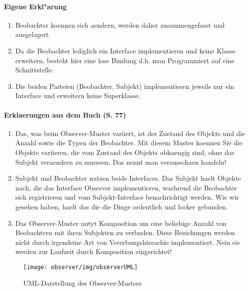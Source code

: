 \paragraph{Eigene Erkl"arung}
\begin{enumerate}
\item Beobachter koennen sich aendern, werden daher zusammengefasst und ausgelagert.
\item Da die Beobachter lediglich ein Interface implementieren und keine Klasse erweitern, besteht 
   hier eine lose Bindung d.h. man Programmiert auf eine Schnittstelle.
\item Die beiden Parteien (Beobachter, Subjekt) implementieren jeweils nur ein Interface und 
   erweitern keine Superklasse.
\end{enumerate}
   
\paragraph{Erklaerungen aus dem Buch (S. 77)}
\begin{enumerate}
\item Das, was beim Observer-Muster variiert, ist der Zustand des Objekts und die Anzahl sowie die 
   Typen der Beobachter. Mit diesem Muster koennen Sie die Objekte variieren, die vom Zustand des 
   Objekts abhaengig sind, ohne das Subjekt veraendern zu muessen. Das nennt man verausschaen 
   handeln!
\item Subjekt und Beobachter nutzen beide Interfaces. Das Subjekt haelt Objekte nach, die das 
   Interface Observer implementieren, waehrend die Beobachter sich registrieren und vom 
   Subjekt-Interface benachrichtigt werden. Wie wir gesehen haben, haelt das die die Dinge 
   ordentlich und locker gebunden. 
\item Das Observer-Muster nutyt Komposition um eine beliebige Anzahl von Beobachtern mit ihren 
   Subjekten zu verbnden. Diese Beziehungen werden nicht durch irgendeine Art von 
   Vererbungshierachie implementiert. Nein sie werden zur Laufzeit durch Komposition eingerichtet!
\end{enumerate}

\begin{figure}
	\centering
	\texttt{[image: observer/img/observerUML]}
	\caption{UML-Darstellung des Observer-Musters}
	\label{fig:observerUML}
\end{figure}
